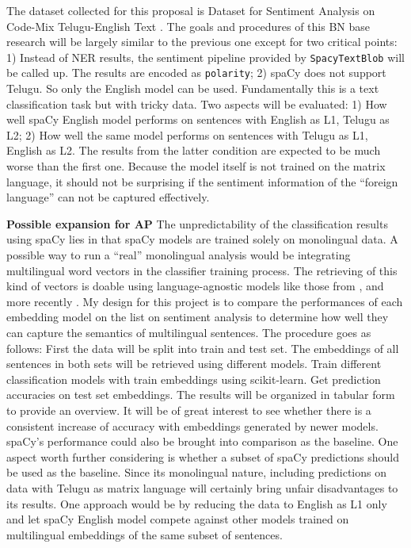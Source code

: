 \documentclass[11pt]{article}
\begin{document}
The dataset collected for this proposal is Dataset for Sentiment Analysis on Code-Mix Telugu-English Text \citep{kusampudi2021cssentiment}. The goals and procedures of this BN base research will be largely similar to the previous one except for two critical points: 1) Instead of NER results, the sentiment pipeline provided by \texttt{SpacyTextBlob} will be called up. The results are encoded as \texttt{polarity}; 2) spaCy does not support Telugu. So only the English model can be used. Fundamentally this is a text classification task but with tricky data. Two aspects will be evaluated: 1) How well spaCy English model performs on sentences with English as L1, Telugu as L2; 2) How well the same model performs on sentences with Telugu as L1, English as L2. The results from the latter condition are expected to be much worse than the first one. Because the model itself is not trained on the matrix language, it should not be surprising if the sentiment information of the ``foreign language'' can not be captured effectively.

\textbf{Possible expansion for AP} The unpredictability of the classification results using spaCy lies in that spaCy models are trained solely on monolingual data. A possible way to run a ``real'' monolingual analysis would be integrating multilingual word vectors in the classifier training process. The retrieving of this kind of vectors is doable using language-agnostic models like those from \citet{smith2017multilang}, \citet{devlin2018mbert} and more recently \citet{conneau2019roberta}. My design for this project is to compare the performances of each embedding model on the list on sentiment analysis to determine how well they can capture the semantics of multilingual sentences. The procedure goes as follows: First the data will be split into train and test set. The embeddings of all sentences in both sets will be retrieved using different models. Train different classification models with train embeddings using scikit-learn. Get prediction accuracies on test set embeddings. The results will be organized in tabular form to provide an overview. It will be of great interest to see whether there is a consistent increase of accuracy with embeddings generated by newer models. spaCy's performance could also be brought into comparison as the baseline. One aspect worth further considering is whether a subset of spaCy predictions should be used as the baseline. Since its monolingual nature, including predictions on data with Telugu as matrix language will certainly bring unfair disadvantages to its results. One approach would be by reducing the data to English as L1 only and let spaCy English model compete against other models trained on multilingual embeddings of the same subset of sentences.







%
\end{document}
